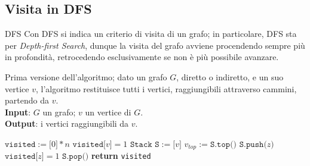 \documentclass[a4paper, 12pt]{report}
\begin{document}
    \subsection{Visita in DFS}

    \begin{frameddefn}{DFS}
        Con DFS si indica un criterio di visita di un grafo; in particolare, DFS sta per \textit{Depth-first Search}, dunque la visita del grafo avviene procendendo sempre più in profondità, retrocedendo esclusivamente se non è più possibile avanzare.
    \end{frameddefn}

    \begin{algorithm}[H]
        \caption{
            Prima versione dell'algoritmo; dato un grafo $G$, diretto o indiretto, e un suo vertice $v$, l'algoritmo restituisce tutti i vertici, raggiungibili attraverso cammini, partendo da $v$.\\
            \textbf{Input}: $G$ un grafo; $v$ un vertice di $G$.\\
            \textbf{Output}: i vertici raggiungibili da $v$.
        }

        \begin{algorithmic}[1]
                \State $\texttt{visited}:=\texttt{[}0\texttt{]} * n$ 
                \State $\texttt{visited[}v\texttt{]} = 1$
                \State $\texttt{Stack S}:=\texttt{[}v\texttt{]}$
                    \State $v_{top}:=\texttt{S.top()}$
                        \State $\texttt{S.push(}z\texttt{)}$
                        \State $\texttt{visited[}z\texttt{]} = 1$
                    \Else
                        \State $\texttt{S.pop()}$
                    \EndIf
                \EndWhile
                \State \textbf{return} \texttt{visited}
            \EndFunction
        \end{algorithmic}
    \end{algorithm}
\end{document}
